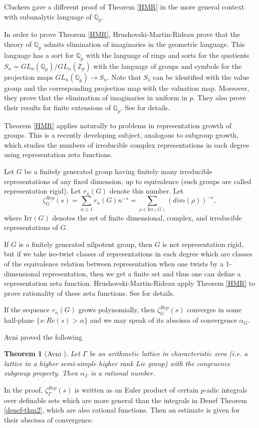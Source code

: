 \documentclass[12pt]{amsart}
\def\Z{\mathbb{Z}}
\def\Q{\mathbb{Q}}
\newtheorem{thm}{Theorem}[section]
\numberwithin{equation}{section}
\begin{document}
 Cluckers \cite[Appendix]{HMR} gave a different proof of Theorem \ref{HMR} in the more general context with  subanalytic language of $\Q_p$. 

In order to prove Theorem \ref{HMR}, Hrushovski-Martin-Rideau prove that the theory of $\Q_p$ admits elimination of 
imaginaries in the geometric language. This language has a sort for $\Q_p$ with the language of rings and sorts for the
quotients $S_n=GL_n(\Q_p)/GL_n(\Z_p)$ with the language of groups and symbols for the projection maps $GL_n(\Q_p) \rightarrow S_n$. Note that $S_1$ can be identified with the value group and the corresponding projection map with the 
valuation map. Moreover, they prove that the elimination of imaginaries in uniform in $p$. They also prove their results for finite extensions of $\Q_p$. See \cite{HMR} for details.

Theorem \ref{HMR} applies naturally to problems in representation growth of groups. This is a recently
developing subject, analogous to subgroup growth, which studies the numbers of irreducible complex representations in each 
degree using representation zeta functions.

Let $G$ be a finitely generated group having finitely many irreducible representations of any fixed dimension, up to equivalence (such groups are called representation rigid). Let $r_n(G)$ denote this number. Let
$$\zeta_{G}^{Rep}(s)=\sum_{n\geq 1} r_n(G)n^{-s}=\sum_{\rho\in \mathrm{Irr}(G)}(dim(\rho))^{-s},$$
where $\mathrm{Irr}(G)$ denotes the set of finite dimensional, complex, and irreducible representations of $G$.

If $G$ is a finitely generated nilpotent group, then $G$ is not representation rigid, but if we take iso-twist classes of representations in each degree which are classes of the equivalence relation between representation when one twists by a 1-dimensional representation, then we get a finite set and thus one can define a representation zeta function. 
Hrushovski-Martin-Rideau apply Theorem \ref{HMR} to prove rationality of these zeta functions. See \cite{HMR} for details. 

If the sequence $r_n(G)$ grows polynomially, then $\zeta_{G}^{Rep}(s)$ converges in some half-plane $\{s: Re(s)>\alpha\}$ 
and we may speak of its abscissa of convergence $\alpha_{G}$.

Avni \cite{Nir} proved the following

\begin{thm}[Avni \cite{Nir}] Let $\Gamma$ be an arithmetic lattice in characteristic zero (i.e. a lattice in a higher semi-simple higher rank Lie group) with the congruence subgroup property. Then $\alpha_{\Gamma}$ is a rational number.\end{thm}
In the proof, $\zeta_{\Gamma}^{Rep}(s)$ is written as an Euler product of certain $p$-adic integrals over definable sets which are more general than the integrals in Denef Theorem \ref{denef-thm2}, which are also rational functions. Then an estimate is given for their abscissa of convergence. 









\end{document}
